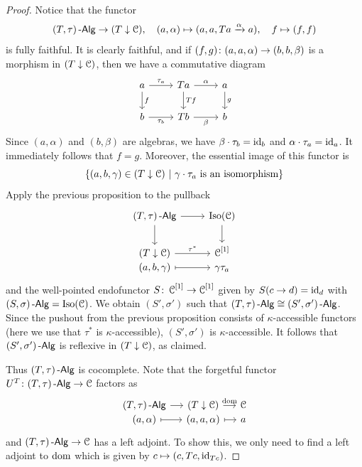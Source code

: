 \documentclass[a4paper,11pt,oneside,openany]{scrbook}
\begin{document}
\begin{proof}
	Notice that the functor
	\begin{displaymath}
		(T,\tau)\operatorname{-\mathsf{Alg}} \to (T \downarrow \operatorname{\mathcal{C}}), \quad (a,\alpha) \mapsto (a,a,Ta \xrightarrow{\alpha} a), \quad f \mapsto (f,f)
	\end{displaymath}
	is fully faithful.
	It is clearly faithful, and if $ (f,g)\colon (a,a,\alpha) \to (b,b,\beta) $
	is a morphism in $ (T \downarrow \operatorname{\mathcal{C}}) $, then we have a commutative diagram
	\begin{displaymath}
		\begin{tikzcd}
			a \arrow[d,"f"]\arrow[r, "\tau_a"]& Ta \arrow[d, "Tf"] \arrow[r, "\alpha"] & a\arrow[d, "g"]\\
			b\arrow[r,"\tau_b"'] & Tb \arrow[r, "\beta"']& b
		\end{tikzcd}
	\end{displaymath}
	Since $(a,\alpha)$ and $(b,\beta)$ are algebras, we have
    $\beta\cdot\tau_b=\operatorname{id}_b$ and $\alpha\cdot\tau_a=\operatorname{id}_a$.
	It immediately follows that $ f = g $.
	Moreover, the essential image of this functor is
	\begin{displaymath}
		\{(a,b,\gamma)\in (T\downarrow\C)\ |\ \gamma\cdot\tau_a \text{ is an isomorphism}\}
	\end{displaymath}
	Apply the previous proposition to the pullback
	\begin{displaymath}
		\begin{tikzcd}
			(T,\tau)\Alg \arrow[d]\arrow[r] & \operatorname{Iso}(\C) \arrow[d]\\
			(T\downarrow\C) \arrow[r, "\tau^*"] & \C^{[1]}\\[-2.1em]
			(a,b,\gamma)\arrow[r, mapsto] & \gamma\tau_a
		\end{tikzcd}
	\end{displaymath}
	and the well-pointed endofunctor $ S\colon \operatorname{\mathcal{C}}^{[1]} \to \operatorname{\mathcal{C}}^{[1]} $ given by $ S(c\to d) = \operatorname{id}_{d} $ with $ (S,\sigma)\operatorname{-\mathsf{Alg}} = \operatorname{Iso}(\operatorname{\mathcal{C}}) $.
	We obtain $ (S',\sigma') $ such that $ (T,\tau)\operatorname{-\mathsf{Alg}} \cong (S',\sigma')\operatorname{-\mathsf{Alg}} $.
	Since the pushout from the previous proposition consists of $ \kappa $-accessible functors (here we use that $ \tau^* $ is $ \kappa $-accessible), $ (S',\sigma') $ is $ \kappa $-accessible.
	It follows that $ (S',\sigma')\operatorname{-\mathsf{Alg}} $ is reflexive in $ (T\downarrow\operatorname{\mathcal{C}}) $, as claimed.

	Thus $ (T,\tau)\operatorname{-\mathsf{Alg}} $ is cocomplete.
	Note that the forgetful functor $ U^T \colon (T,\tau)\operatorname{-\mathsf{Alg}} \to \operatorname{\mathcal{C}} $ factors as
	\begin{displaymath}
		\begin{tikzcd}[column sep = small]
			(T,\tau)\Alg \arrow[r]& (T\downarrow\C)\arrow[r,"\text{dom}"] & \C  \\[-2.1em]
			(a,\alpha) \arrow[r,mapsto] & (a,a,\alpha) \arrow[r,mapsto] & a
		\end{tikzcd}
	\end{displaymath}
	and $ (T,\tau)\operatorname{-\mathsf{Alg}} \to \operatorname{\mathcal{C}} $ has a left adjoint.
	To show this, we only need to find a left adjoint to $ \operatorname{dom} $ which is given
    by $ c \mapsto (c,Tc, \operatorname{id}_{Tc}) $.
\end{proof}
\end{document}
